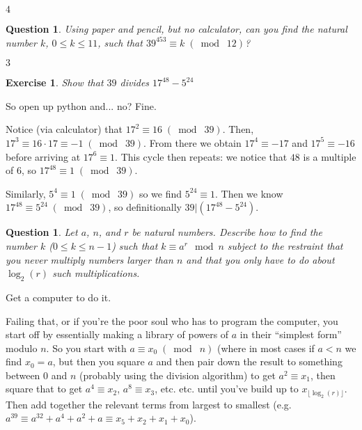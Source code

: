 \documentclass{article}
\newtheorem{ques}[thm]{Question}
\newtheorem{ex}[thm]{Exercise}
\numberwithin{equation}{thm}
\providecommand{\gmod}[1]{\; (\bmod \; #1)}
\begin{document}
$4$



\begin{ques} \label{3.4}
  Using paper and pencil, but no calculator, can you find the natural number $k$, $0 \leq k \leq 11$, such that $39^{453} \equiv k \gmod{12}$?
\end{ques}

$3$



\begin{ex} \label{3.5}
  Show that $39$ divides $17^{48} - 5^{24}$
\end{ex}

So open up python and... no? Fine.

Notice (via calculator) that $17^2 \equiv 16 \gmod{39}$. Then, $17^3 \equiv 16 \cdot 17 \equiv -1 \gmod{39}$. From there we obtain $17^4 \equiv -17$ and $17^5 \equiv -16$ before arriving at $17^6 \equiv 1$. This cycle then repeats: we notice that $48$ is a multiple of $6$, so $17^{48} \equiv 1 \gmod{39}$.

Similarly, $5^4 \equiv 1 \gmod{39}$ so we find $5^{24} \equiv 1$. Then we know $17^{48} \equiv 5^{24} \gmod{39}$, so definitionally $39 | (17^{48} - 5^{24})$.



\begin{ques} \label{3.6}
  Let $a$, $n$, and $r$ be natural numbers. Describe how to find the number $k$ ($0 \leq k \leq n-1$) such that $k \equiv a^{r} \mod n$ subject to the restraint that you never multiply numbers larger than $n$ and that you only have to do about $\log_2 (r)$ such multiplications.
\end{ques}

Get a computer to do it.

Failing that, or if you're the poor soul who has to program the computer, you start off by essentially making a library of powers of $a$ in their ``simplest form'' modulo $n$. So you start with $a \equiv x_0 \gmod n$ (where in most cases if $a < n$ we find $x_0 = a$, but then you square $a$ and then pair down the result to something between $0$ and $n$ (probably using the division algorithm) to get $a^2 \equiv x_1$, then square that to get $a^4 \equiv x_2$, $a^8 \equiv x_3$, etc. etc. until you've build up to $x_{\lfloor \log_2 (r) \rfloor}$. Then add together the relevant terms from largest to smallest (e.g. $a^{39} \equiv a^{32} + a^4 + a^2 + a \equiv x_5 + x_2 + x_1 + x_0$).
\end{document}
